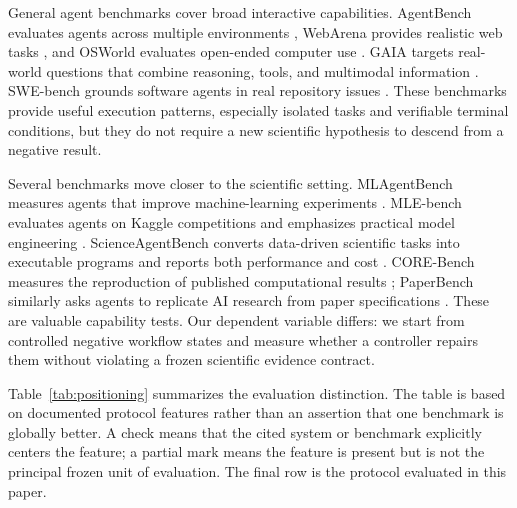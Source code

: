 General agent benchmarks cover broad interactive capabilities. AgentBench
evaluates agents across multiple environments \cite{liu2023agentbench},
WebArena provides realistic web tasks \cite{zhou2024webarena}, and OSWorld
evaluates open-ended computer use \cite{xie2024osworld}. GAIA targets
real-world questions that combine reasoning, tools, and multimodal
information \cite{mialon2023gaia}. SWE-bench grounds software agents in real
repository issues \cite{jimenez2024swebench}. These benchmarks provide useful
execution patterns, especially isolated tasks and verifiable terminal
conditions, but they do not require a new scientific hypothesis to descend
from a negative result.

Several benchmarks move closer to the scientific setting. MLAgentBench
measures agents that improve machine-learning experiments
\cite{huang2023mlagentbench}. MLE-bench evaluates agents on Kaggle
competitions and emphasizes practical model engineering
\cite{chan2024mlebench}. ScienceAgentBench converts data-driven scientific
tasks into executable programs and reports both performance and cost
\cite{chen2024scienceagentbench}. CORE-Bench measures the reproduction of
published computational results \cite{siegel2024corebench}; PaperBench
similarly asks agents to replicate AI research from paper specifications
\cite{starace2025paperbench}. These are valuable capability tests. Our
dependent variable differs: we start from controlled negative workflow states
and measure whether a controller repairs them without violating a frozen
scientific evidence contract.

Table~\ref{tab:positioning} summarizes the evaluation distinction. The table
is based on documented protocol features rather than an assertion that one
benchmark is globally better. A check means that the cited system or
benchmark explicitly centers the feature; a partial mark means the feature is
present but is not the principal frozen unit of evaluation. The final row is
the protocol evaluated in this paper.

